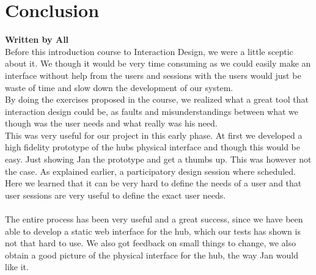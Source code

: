 \chapter{Conclusion}
\textbf{Written by All}\\
Before this introduction course to Interaction Design, we were a little sceptic about it. We though it would be very time consuming as we could easily make an interface without help from the users and sessions with the users would just be waste of time and slow down the development of our system.\\
By doing the exercises proposed in the course, we realized what a great tool that interaction design could be, as faults and misunderstandings between what we though was the user needs and what really was his need.\\
This was very useful for our project in this early phase. At first we developed a high fidelity prototype of the hubs physical interface and though this would be easy. Just showing Jan the prototype and get a thumbs up. This was however not the case. As explained earlier, a participatory design session where scheduled. Here we learned that it can be very hard to define the needs of a user and that user sessions are very useful to define the exact user needs.
\\\\
The entire process has been very useful and a great success, since we have been able to develop a static web interface for the hub, which our tests has shown is not that hard to use. We also got feedback on small things to change, we also obtain a good picture of the physical interface for the hub, the way Jan would like it.





